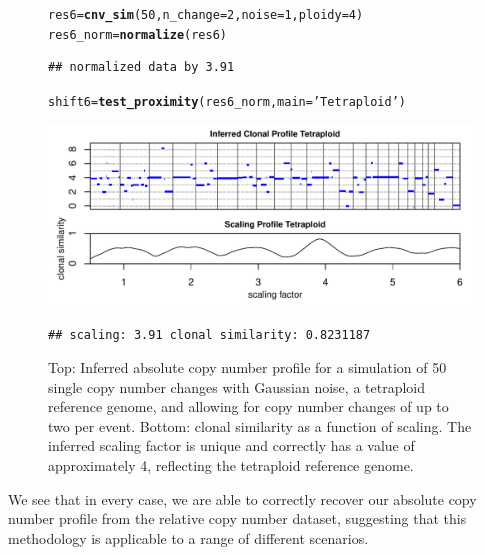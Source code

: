 \documentclass[12pt]{article}\usepackage[]{graphicx}\usepackage[]{color}
\makeatletter
\newcommand{\hlnum}[1]{\textcolor[rgb]{0.686,0.059,0.569}{#1}}%
\newcommand{\hlstr}[1]{\textcolor[rgb]{0.192,0.494,0.8}{#1}}%
\newcommand{\hlstd}[1]{\textcolor[rgb]{0.345,0.345,0.345}{#1}}%
\newcommand{\hlkwb}[1]{\textcolor[rgb]{0.69,0.353,0.396}{#1}}%
\newcommand{\hlkwc}[1]{\textcolor[rgb]{0.333,0.667,0.333}{#1}}%
\newcommand{\hlkwd}[1]{\textcolor[rgb]{0.737,0.353,0.396}{\textbf{#1}}}%
\newenvironment{kframe}{%
 \def\at@end@of@kframe{}%
 \ifinner\ifhmode%
  \def\at@end@of@kframe{\end{minipage}}%
  \begin{minipage}{\columnwidth}%
 \fi\fi%
 \def\FrameCommand##1{\hskip\@totalleftmargin \hskip-\fboxsep
 \colorbox{shadecolor}{##1}\hskip-\fboxsep
     \hskip-\linewidth \hskip-\@totalleftmargin \hskip\columnwidth}%
 \MakeFramed {\advance\hsize-\width
   \@totalleftmargin\z@ \linewidth\hsize
   \@setminipage}}%
 {\par\unskip\endMakeFramed%
 \at@end@of@kframe}
\newenvironment{knitrout}{}{} %
\makeatother
\begin{document}
\begin{figure}[h!]
  \centering
\begin{knitrout}
\color{fgcolor}\begin{kframe}
\begin{alltt}
\hlstd{res6} \hlkwb{=} \hlkwd{cnv_sim} \hlstd{(}\hlnum{50}\hlstd{,} \hlkwc{n_change} \hlstd{=} \hlnum{2}\hlstd{,} \hlkwc{noise} \hlstd{=} \hlnum{1}\hlstd{,} \hlkwc{ploidy}\hlstd{=}\hlnum{4}\hlstd{)}
\hlstd{res6_norm} \hlkwb{=} \hlkwd{normalize}\hlstd{(res6)}
\end{alltt}
\begin{verbatim}
## normalized data by 3.91
\end{verbatim}
\begin{alltt}
\hlstd{shift6} \hlkwb{=} \hlkwd{test_proximity}\hlstd{(res6_norm,} \hlkwc{main} \hlstd{=} \hlstr{'Tetraploid'}\hlstd{)}
\end{alltt}
\end{kframe}
\includegraphics[width=.95\linewidth]{figure/unnamed-chunk-12-1} 
\begin{kframe}\begin{verbatim}
## scaling: 3.91 clonal similarity: 0.8231187
\end{verbatim}
\end{kframe}
\end{knitrout}
\caption{Top: Inferred absolute copy number profile for a simulation of 50 single copy number changes with Gaussian noise, a tetraploid reference genome, and allowing for copy number changes of up to two per event. Bottom: clonal similarity as a function of scaling. The inferred scaling factor is unique and correctly has a value of approximately 4, reflecting the tetraploid reference genome.}
\label{fig:rel_tetra}
\end{figure}

We see that in every case, we are able to correctly recover our absolute copy number profile from the relative copy number dataset, suggesting that this methodology is applicable to a range of different scenarios.
\end{document}
